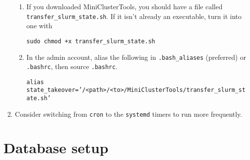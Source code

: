 \begin{enumerate}
	\begin{enumerate}
	\item If you downloaded MiniClusterTools, you should have a file called \texttt{transfer\_slurm\_state.sh}. If it isn't already an executable, turn it into one with

		\texttt{sudo chmod +x transfer\_slurm\_state.sh}

	\item In the admin account, alias the following in \texttt{.bash\_aliases} (preferred) or \texttt{.bashrc}, then source \texttt{.bashrc}.

		\texttt{alias state\_takeover='/<path>/<to>/MiniClusterTools/transfer\_slurm\_state.sh'}
		
	\end{enumerate}

\item Consider switching from \texttt{cron} to the \texttt{systemd} timers to run more frequently.
\end{enumerate}

\section{Database setup} \label{sec:slurmDB}

